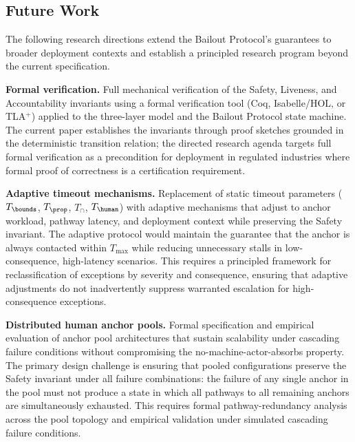 \subsection{Future Work}
\label{sec:future-work}

The following research directions extend the Bailout Protocol's guarantees to broader deployment contexts and establish a principled research program beyond the current specification.

\textbf{Formal verification.}  Full mechanical verification of the Safety, Liveness, and Accountability invariants using a formal verification tool (Coq, Isabelle/HOL, or TLA$^+$) applied to the three-layer model and the Bailout Protocol state machine.  The current paper establishes the invariants through proof sketches grounded in the deterministic transition relation; the directed research agenda targets full formal verification as a precondition for deployment in regulated industries where formal proof of correctness is a certification requirement.

\textbf{Adaptive timeout mechanisms.}  Replacement of static timeout parameters ($T_{\bounds}$, $T_{\prop}$, $T_{\cap}$, $T_{\human}$) with adaptive mechanisms that adjust to anchor workload, pathway latency, and deployment context while preserving the Safety invariant.  The adaptive protocol would maintain the guarantee that the anchor is always contacted within $T_{\max}$ while reducing unnecessary stalls in low-consequence, high-latency scenarios.  This requires a principled framework for reclassification of exceptions by severity and consequence, ensuring that adaptive adjustments do not inadvertently suppress warranted escalation for high-consequence exceptions.

\textbf{Distributed human anchor pools.}  Formal specification and empirical evaluation of anchor pool architectures that sustain scalability under cascading failure conditions without compromising the no-machine-actor-absorbs property.  The primary design challenge is ensuring that pooled configurations preserve the Safety invariant under all failure combinations: the failure of any single anchor in the pool must not produce a state in which all pathways to all remaining anchors are simultaneously exhausted.  This requires formal pathway-redundancy analysis across the pool topology and empirical validation under simulated cascading failure conditions.

